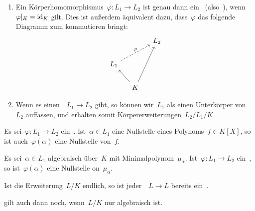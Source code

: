 \begin{remark}
  \leavevmode
  \begin{enumerate}
    \item
      Ein Körperhomomorphismus~$\varphi \colon L_1 \to L_2$ ist genau dann ein~ (also~), wenn~$\restrict{\varphi}{K} = \id_K$ gilt.
      Dies ist außerdem äquivalent dazu, dass~$\varphi$ das folgende Diagramm zum kommutieren bringt:
      \[
        \begin{tikzcd}[column sep = small]
          {}
          &
          {}
          &
          L_2
          \\
          L_1
          \arrow[dashed]{urr}[above]{\varphi}
          &
          {}
          &
          {}
          \\
          {}
          &
          K
          \arrow{ul}
          \arrow{uur}
          &
          {}
        \end{tikzcd}
      \]
    \item
      Wenn es einen~~$L_1 \to L_2$ gibt, so können wir~$L_1$ als einen Unterkörper von~$L_2$ auffassen, und erhalten somit Körpererweiterungen~$L_2/L_1/K$.
  \end{enumerate}
\end{remark}

\begin{lemma}
  Es sei~$\varphi \colon L_1 \to L_2$ ein~.
  Ist~$\alpha \in L_1$ eine Nullstelle eines Polynoms~$f \in K[X]$, so ist auch~$\varphi(\alpha)$ eine Nullstelle von~$f$.
\end{lemma}

\begin{corollary}
  Es sei~$\alpha \in L_1$ algebraisch über~$K$ mit Minimalpolynom~$\mu_\alpha$.
  Ist~$\varphi \colon L_1 \to L_2$ ein~, so ist~$\varphi(\alpha)$ eine Nullstelle on~$\mu_\alpha$.
\end{corollary}

\begin{proposition}
  \label{homos are autos for finite extension}
  Ist die Erweiterung~$L/K$ endlich, so ist jeder~~$L \to L$ bereits ein~.
\end{proposition}

\begin{remark}
   gilt auch dann noch, wenn~$L/K$ nur algebraisch ist.
\end{remark}



